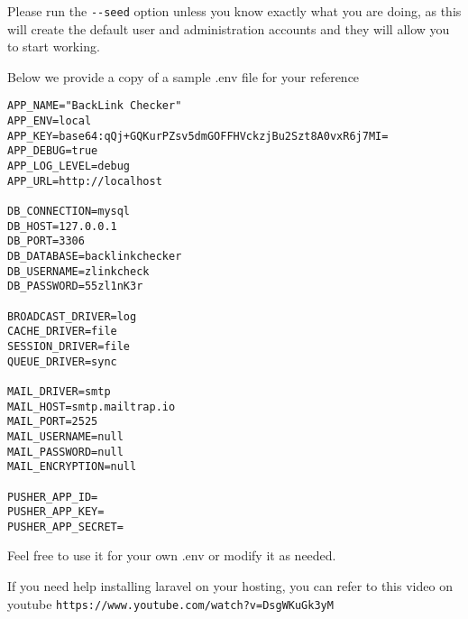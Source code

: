 Please run the \verb|--seed| option unless you know exactly what you are doing, as this will create the default user and administration accounts and they will allow you to start working.

Below we provide a copy of a sample .env file for your reference
\begin{verbatim}
APP_NAME="BackLink Checker"
APP_ENV=local
APP_KEY=base64:qQj+GQKurPZsv5dmGOFFHVckzjBu2Szt8A0vxR6j7MI=
APP_DEBUG=true
APP_LOG_LEVEL=debug
APP_URL=http://localhost

DB_CONNECTION=mysql
DB_HOST=127.0.0.1
DB_PORT=3306
DB_DATABASE=backlinkchecker
DB_USERNAME=zlinkcheck
DB_PASSWORD=55zl1nK3r

BROADCAST_DRIVER=log
CACHE_DRIVER=file
SESSION_DRIVER=file
QUEUE_DRIVER=sync

MAIL_DRIVER=smtp
MAIL_HOST=smtp.mailtrap.io
MAIL_PORT=2525
MAIL_USERNAME=null
MAIL_PASSWORD=null
MAIL_ENCRYPTION=null

PUSHER_APP_ID=
PUSHER_APP_KEY=
PUSHER_APP_SECRET=
\end{verbatim}

Feel free to use it for your own .env or modify it as needed.

If you need help installing laravel on your hosting, you can refer to this video on youtube \verb|https://www.youtube.com/watch?v=DsgWKuGk3yM|